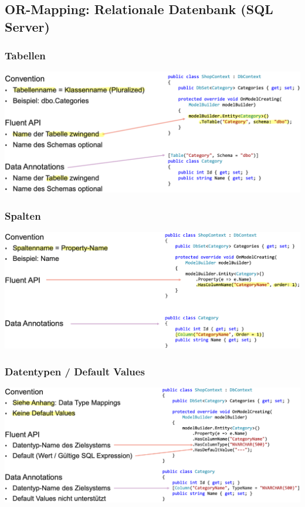 \subsection{OR-Mapping: Relationale Datenbank (SQL Server)}

\subsubsection{Tabellen}
\begin{center}
    \includegraphics[scale=.37]{graphic/efc/tabellen.png}
\end{center}
\vspace{-8pt}

\subsubsection{Spalten}
\begin{center}
    \includegraphics[scale=.37]{graphic/efc/Spalten.png}
\end{center}
\vspace{-8pt}

\subsubsection{Datentypen / Default Values}
\begin{center}
    \includegraphics[scale=.37]{graphic/efc/Datentypen Default Values.png}
\end{center}
\vspace{-8pt}

